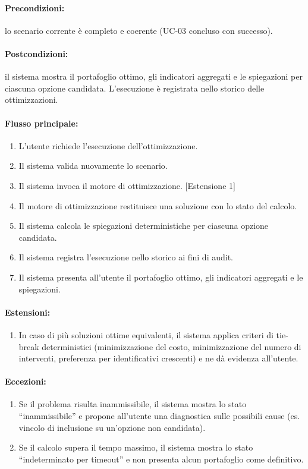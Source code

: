 \paragraph{Precondizioni:} lo scenario corrente è completo e coerente (UC-03 concluso con successo).

\paragraph{Postcondizioni:} il sistema mostra il portafoglio ottimo, gli indicatori aggregati e le spiegazioni per ciascuna opzione candidata. L'esecuzione è registrata nello storico delle ottimizzazioni.

\paragraph{Flusso principale:}
\begin{enumerate}
    \item L'utente richiede l'esecuzione dell'ottimizzazione.
    \item Il sistema valida nuovamente lo scenario.
    \item Il sistema invoca il motore di ottimizzazione. [Estensione 1]
    \item Il motore di ottimizzazione restituisce una soluzione con lo stato del calcolo.
    \item Il sistema calcola le spiegazioni deterministiche per ciascuna opzione candidata.
    \item Il sistema registra l'esecuzione nello storico ai fini di audit.
    \item Il sistema presenta all'utente il portafoglio ottimo, gli indicatori aggregati e le spiegazioni.
\end{enumerate}

\paragraph{Estensioni:}
\begin{enumerate}
    \item In caso di più soluzioni ottime equivalenti, il sistema applica criteri di tie-break deterministici (minimizzazione del costo, minimizzazione del numero di interventi, preferenza per identificativi crescenti) e ne dà evidenza all'utente.
\end{enumerate}

\paragraph{Eccezioni:}
\begin{enumerate}
    \item Se il problema risulta inammissibile, il sistema mostra lo stato ``inammissibile'' e propone all'utente una diagnostica sulle possibili cause (es. vincolo di inclusione su un'opzione non candidata).
    \item Se il calcolo supera il tempo massimo, il sistema mostra lo stato ``indeterminato per timeout'' e non presenta alcun portafoglio come definitivo.
\end{enumerate}

